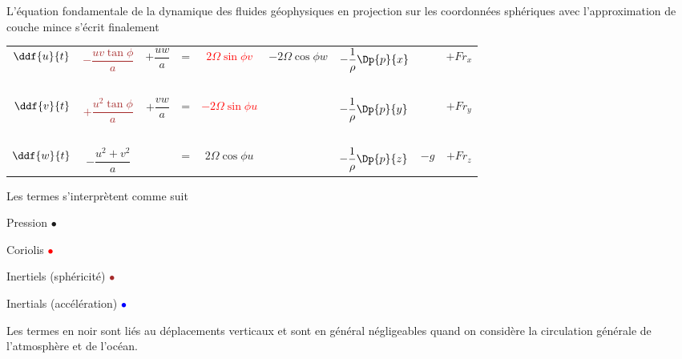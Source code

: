 \sk
L'équation fondamentale de la dynamique des fluides géophysiques 
en projection sur les coordonnées sphériques avec l'approximation de couche mince
s'écrit finalement

\begin{center}
\begin{tabular}{ccccccccc}
\textcolor{blue}{$\ddf{u}{t}$} & 
\textcolor{brown}{$-\dfrac{uv\tan\phi}{a}$} & 
$+\dfrac{uw}{a}$ & 
= & 
\textcolor{red}{$2\Omega\sin\phi v$} & 
$-2\Omega \cos\phi w$ & 
\textcolor{green!75!black}{$-\dfrac{1}{\rho}\Dp{p}{x}$} & 
& 
$+Fr_x$\\
~\\
\textcolor{blue}{$\ddf{v}{t}$} & 
\textcolor{brown}{$+\dfrac{u^2\tan\phi}{a}$} & 
$+\dfrac{vw}{a}$ & 
= & 
\textcolor{red}{$-2\Omega\sin\phi u$} &
&
\textcolor{green!75!black}{$-\dfrac{1}{\rho}\Dp{p}{y}$} &
&
$+Fr_y$\\
~\\
$\ddf{w}{t}$ & 
$-\dfrac{u^2+v^2}{a}$ & 
&
=&
$2\Omega\cos\phi u$ & 
& 
\textcolor{green!75!black}{$-\dfrac{1}{\rho}\Dp{p}{z}$} & 
\textcolor{green!75!black}{$ -g$} & 
$+Fr_z$\\ 
\end{tabular}
\end{center}

\sk
Les termes s'interprètent comme suit
\begin{citemize}
\item{Pression} \textcolor{green!75!black}{$\bullet$} 
\item{Coriolis} \textcolor{red}{$\bullet$}
\item{Inertiels (sphéricité)} \textcolor{brown}{$\bullet$}
\item{Inertials (accélération)} \textcolor{blue}{$\bullet$}
\end{citemize}
Les termes en noir sont liés au déplacements verticaux et sont en général négligeables quand on considère la circulation générale de l'atmosphère et de l'océan.
